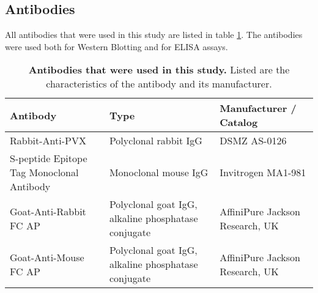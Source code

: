 \subsection{Antibodies}
All antibodies that were used in this study are listed in table \ref{tab:materials_antibodies}. The antibodies were used both for Western Blotting and for ELISA assays. 
\begin{table}[h]
    \centering
    \caption{\textbf{Antibodies that were used in this study.} Listed are the characteristics of the antibody and its manufacturer. }
    \begin{tabular}{lll}
    \toprule
    \textbf{Antibody} & \textbf{Type} & \textbf{Manufacturer / Catalog} \\
    \midrule
    Rabbit-Anti-PVX & Polyclonal rabbit IgG & DSMZ AS-0126 \\
    S-peptide Epitope Tag Monoclonal Antibody & Monoclonal mouse IgG & Invitrogen MA1-981 \\
    Goat-Anti-Rabbit FC AP & Polyclonal goat IgG, alkaline phosphatase conjugate & AffiniPure Jackson Research, UK \\
    Goat-Anti-Mouse FC AP & Polyclonal goat IgG, alkaline phosphatase conjugate & AffiniPure Jackson Research, UK \\
    \bottomrule
    \end{tabular}
    \label{tab:materials_antibodies}
\end{table}
\FloatBarrier
